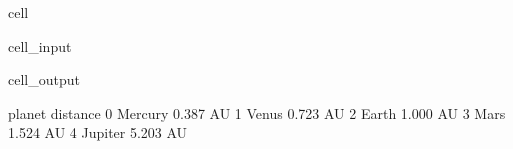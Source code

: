 \documentclass[letterpaper,10pt,english]{jupyterBook}
\begin{document}
\begin{sphinxuseclass}{cell}\begin{sphinxVerbatimInput}

\begin{sphinxuseclass}{cell_input}
\begin{sphinxVerbatim}[commandchars=\\\{\}]
   
  
\end{sphinxVerbatim}

\end{sphinxuseclass}\end{sphinxVerbatimInput}
\begin{sphinxVerbatimOutput}

\begin{sphinxuseclass}{cell_output}
\begin{sphinxVerbatim}[commandchars=\\\{\}]
    planet  distance
0  Mercury  0.387 AU
1    Venus  0.723 AU
2    Earth  1.000 AU
3     Mars  1.524 AU
4  Jupiter  5.203 AU
\end{sphinxVerbatim}

\end{sphinxuseclass}\end{sphinxVerbatimOutput}

\end{sphinxuseclass}
\end{document}
